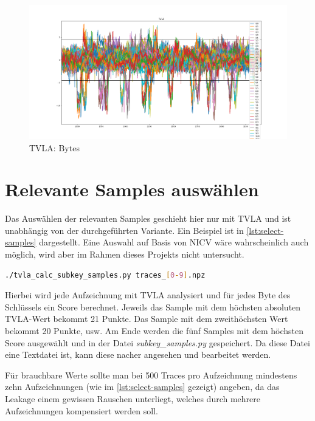 \documentclass[a4paper,ngerman]{scrreprt}
\begin{document}
\begin{figure}[H]
    \caption{TVLA: Bytes}
    \label{fig:plot-tvla-bytes}

    \includegraphics[width=\textwidth]{img/tvla_specific_bytes.png}
\end{figure}


\section{Relevante Samples auswählen}
\label{sec:select-relevant-samples}

Das Auswählen der relevanten Samples geschieht hier nur mit TVLA und ist
unabhängig von der durchgeführten Variante. Ein Beispiel ist in
\autoref{lst:select-samples} dargestellt. Eine Auswahl auf Basis von NICV wäre
wahrscheinlich auch möglich, wird aber im Rahmen dieses Projekts nicht
untersucht.

\begin{lstlisting}[language=bash, caption={Samples auswählen}, label=lst:select-samples]
./tvla_calc_subkey_samples.py traces_[0-9].npz
\end{lstlisting}

\medskip

Hierbei wird jede Aufzeichnung mit TVLA analysiert und für jedes Byte des
Schlüssels ein Score berechnet. Jeweils das Sample mit dem höchsten absoluten
TVLA-Wert bekommt 21 Punkte. Das Sample mit dem zweithöchsten Wert bekommt 20
Punkte, usw.  Am Ende werden die fünf Samples mit dem höchsten Score ausgewählt
und in der Datei \emph{subkey\_samples.py} gespeichert. Da diese Datei eine
Textdatei ist, kann diese nacher angesehen und bearbeitet werden.

Für brauchbare Werte sollte man bei 500 Traces pro Aufzeichnung mindestens zehn
Aufzeichnungen (wie im \autoref{lst:select-samples} gezeigt) angeben, da das
Leakage einem gewissen Rauschen unterliegt, welches durch mehrere Aufzeichnungen
kompensiert werden soll.
\end{document}
